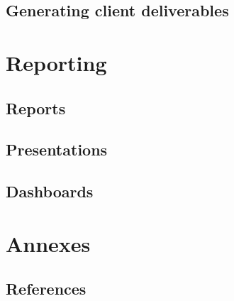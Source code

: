 \documentclass[
  letterpaper,
  DIV=11,
  numbers=noendperiod]{scrreprt}
\newlength{\cslhangindent}
\newenvironment{CSLReferences}[2] %
 {\begin{list}{}{%
  \setlength{\itemindent}{0pt}
  \setlength{\leftmargin}{0pt}
  \setlength{\parsep}{0pt}
  \ifodd #1
   \setlength{\leftmargin}{\cslhangindent}
   \setlength{\itemindent}{-1\cslhangindent}
  \fi
  \setlength{\itemsep}{#2\baselineskip}}}
 {\end{list}}
\begin{document}
\chapter{Generating client
deliverables}\label{generating-client-deliverables}

\part{Reporting}

\chapter{Reports}\label{reports}

\chapter{Presentations}\label{presentations}

\chapter{Dashboards}\label{dashboards}

\part{Annexes}

\chapter*{References}\label{references}


\label{refs}
\begin{CSLReferences}{0}{1}
\end{CSLReferences}
\end{document}
